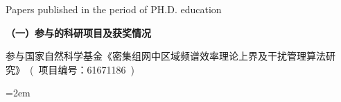
{} {Papers
published in the period of PH.D. education}
\setlength{\parindent}{0em}

\textbf{（一）参与的科研项目及获奖情况}
\begin{publist}
\item 参与国家自然科学基金《密集组网中区域频谱效率理论上界及干扰管理算法研究》~(~项目编号：61671186~)
\end{publist}
\vfill
{}\hangindent=2em\noindent

\setlength{\parindent}{2em}

